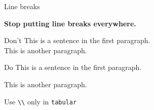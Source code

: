 \documentclass[aspectratio=169]{beamer}
\begin{document}








\begin{frame}[fragile]{Line breaks}

  {\LARGE \bfseries Stop putting line breaks everywhere.}

    \begin{exlisting}{Don't}
This is a sentence in the first paragraph. \\
This is another paragraph.
    \end{exlisting}

  \begin{exlisting}{Do}
This is a sentence in the first paragraph.

This is another paragraph.
  \end{exlisting}

  Use \lstinline!\\! only in \lstinline!tabular!

\end{frame}
\end{document}
